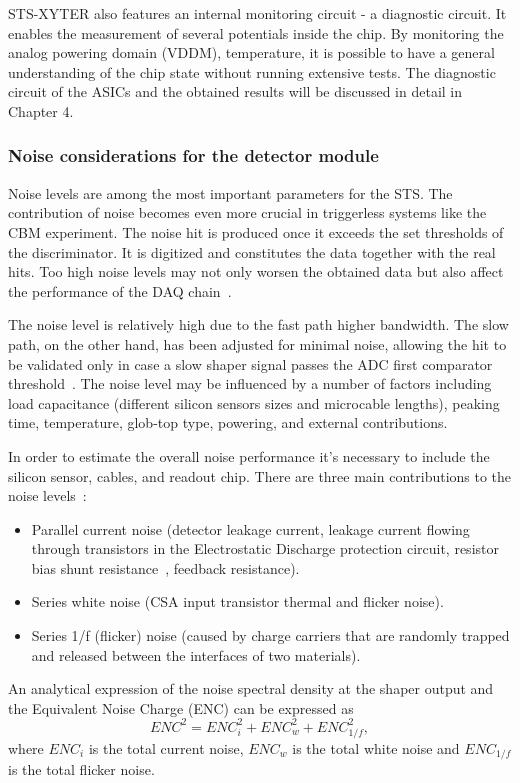 STS-XYTER also features an internal monitoring circuit - a diagnostic circuit. It enables the measurement of several potentials inside the chip. By monitoring the analog powering domain (VDDM), temperature, it is possible to have a general understanding of the chip state without running extensive tests. The diagnostic circuit of the \glspl{ASIC} and the obtained results will be discussed in detail in Chapter 4.
\subsubsection{Noise considerations for the detector module}
Noise levels are among the most important parameters for the \gls{STS}. The contribution of noise becomes even more crucial in triggerless systems like the \gls{CBM} experiment. The noise hit is produced once it exceeds the set thresholds of the discriminator. It is digitized and constitutes the data together with the real hits. Too high noise levels may not only worsen the obtained data but also affect the performance of the \gls{DAQ} chain~\cite{Heuser:54798}.

The noise level is relatively high due to the fast path higher bandwidth. The slow path, on the other hand, has been adjusted for minimal noise, allowing the hit to be validated only in case a slow shaper signal passes the ADC first comparator threshold~\cite{RodriguezRodriguez2020}. The noise level may be influenced by a number of factors including load capacitance 
(different silicon sensors sizes and microcable lengths), peaking time, temperature, glob-top type, powering, and external contributions.

In order to estimate the overall noise performance it's necessary to include the silicon sensor, cables, and readout chip. There are three main contributions to the noise levels~\cite{Toia:209729}:
\begin{itemize}
    \item Parallel current noise (detector leakage current, leakage current flowing through transistors in the Electrostatic Discharge protection circuit, resistor bias shunt resistance~\cite{Spieler}, feedback resistance).
    \item Series white noise (\gls{CSA} input transistor thermal and flicker noise).
    \item Series 1/f (flicker) noise (caused by charge carriers that are randomly trapped and released between the interfaces of two materials).
\end{itemize}
An analytical expression of the noise spectral density at the shaper output and the Equivalent Noise Charge (\gls{ENC}) can be expressed as
\begin{equation}
    ENC^{2} = ENC^{2}_{i} + ENC^{2}_{w} + ENC^{2}_{1/f},
\end{equation}
where $ENC_{i}$  is the total current noise, $ ENC_{w}$ is the total white noise and $ENC_{1/f}$ is the total flicker noise. 

